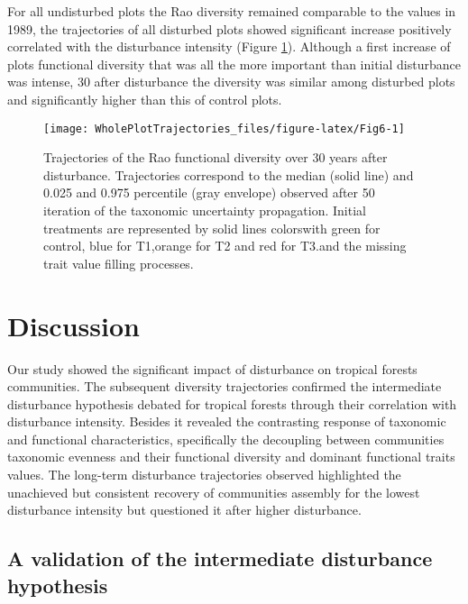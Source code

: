 \documentclass[fleqn,10pt]{ArtEcoFoG} %
\theoremstyle{definition}
\theoremstyle{definition}
\theoremstyle{definition}
\theoremstyle{remark}
\begin{document}
For all undisturbed plots the Rao diversity remained comparable to the
values in 1989, the trajectories of all disturbed plots showed
significant increase positively correlated with the disturbance
intensity (Figure \ref{fig:Fig6}). Although a first increase of plots
functional diversity that was all the more important than initial
disturbance was intense, 30 after disturbance the diversity was similar
among disturbed plots and significantly higher than this of control
plots.

\begin{figure}

{\centering \texttt{[image: WholePlotTrajectories\_files/figure-latex/Fig6-1]} 

}

\caption{Trajectories of the Rao functional diversity over 30 years after disturbance. Trajectories correspond to the median (solid line) and 0.025 and 0.975 percentile (gray envelope) observed after 50 iteration of the taxonomic uncertainty propagation. Initial treatments are represented by solid lines colorswith green for control, blue for T1,orange for T2 and red for T3.and the missing trait value filling processes.}\label{fig:Fig6}
\end{figure}

\section{Discussion}\label{discussion}

Our study showed the significant impact of disturbance on tropical
forests communities. The subsequent diversity trajectories confirmed the
intermediate disturbance hypothesis debated for tropical forests through
their correlation with disturbance intensity. Besides it revealed the
contrasting response of taxonomic and functional characteristics,
specifically the decoupling between communities taxonomic evenness and
their functional diversity and dominant functional traits values. The
long-term disturbance trajectories observed highlighted the unachieved
but consistent recovery of communities assembly for the lowest
disturbance intensity but questioned it after higher disturbance.

\subsection{A validation of the intermediate disturbance
hypothesis}\label{a-validation-of-the-intermediate-disturbance-hypothesis}
\end{document}
